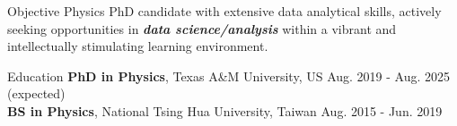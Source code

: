 \documentclass{resume}
\begin{document}
\vspace{-1.5em}
\begin{rSection}{Objective}
    Physics PhD candidate with extensive data analytical skills,
    actively seeking opportunities in \textbf{\textit{data science/analysis}} within a vibrant and intellectually stimulating learning environment.
\end{rSection}


\vspace{-0.25em}
\begin{rSection}{Education}
\vspace{-0.25em}
{\bf PhD in Physics}, Texas A\&M University, US \hfill {Aug. 2019 - Aug. 2025 (expected)} \\
{\bf BS in Physics}, National Tsing Hua University, Taiwan \hfill {Aug. 2015 - Jun. 2019}
\end{rSection}
\end{document}
